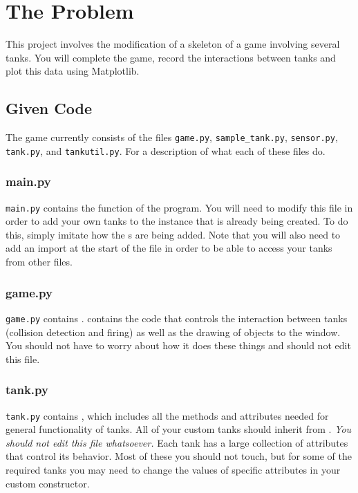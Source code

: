 \documentclass[11pt]{cselabheader}
\begin{document}
\pagebreak
{}


\section{The Problem}

This project involves the modification of a skeleton of a game
involving several tanks.  You will complete the game, record the
interactions between tanks and plot this data using Matplotlib.

\subsection{Given Code}

The game currently consists of the files \texttt{game.py},
\texttt{sample\_tank.py}, \texttt{sensor.py}, \texttt{tank.py}, and
\texttt{tankutil.py}. For a description of what each of these files
do.

\subsubsection{main.py}
\texttt{main.py} contains the  function of the program.
You will need to modify this file in order to add your own tanks to the
 instance that is already being created. To do this,
simply imitate how the s are being added. Note
that you will also need to add an import at the start of the file in
order to be able to access your tanks from other files.

\subsubsection{game.py}
\texttt{game.py} contains . 
contains the code that controls the interaction between tanks (collision
detection and firing) as well as the drawing of objects to the
 window. You should not have to worry about how it does
these things and should not edit this file.

\subsubsection{tank.py}
\texttt{tank.py} contains , which includes all the
methods and attributes needed for general functionality of tanks. All of your
custom tanks should inherit from . \emph{You should not edit
this file whatsoever.} Each tank has a large collection of attributes that
control its behavior. Most of these you should not touch, but for some of the
required tanks you may need to change the values of specific attributes in
your custom constructor.
\end{document}
